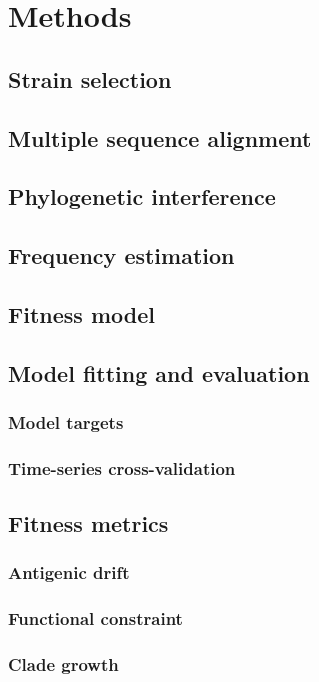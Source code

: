 \section*{Methods}

\subsection*{Strain selection}

\subsection*{Multiple sequence alignment}

\subsection*{Phylogenetic interference}

\subsection*{Frequency estimation}

\subsection*{Fitness model}

\subsection*{Model fitting and evaluation}

\subsubsection*{Model targets}

\subsubsection*{Time-series cross-validation}

\subsection*{Fitness metrics}

\subsubsection*{Antigenic drift}

\subsubsection*{Functional constraint}

\subsubsection*{Clade growth}
